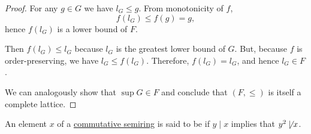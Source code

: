 \begin{proof}
  For any \( g \in G \) we have \( l_G \leq g \). From monotonicity of \( f \),
  \begin{equation*}
    f(l_G) \leq f(g) = g,
  \end{equation*}
  hence \( f(l_G) \) is a lower bound of \( F \).

  Then \( f(l_G) \leq l_G \) because \( l_G \) is the greatest lower bound of \( G \). But, because \( f \) is order-preserving, we have \( l_G \leq f(l_G) \). Therefore, \( f(l_G) = l_G \), and hence \( l_G \in F \).

  We can analogously show that \( \sup G \in F \) and conclude that \( (F, \leq) \) is itself a complete lattice.
\end{proof}

\begin{definition}\label{def:square_free}\mimprovised
  An element \( x \) of a \hyperref[def:semiring/commutative]{commutative semiring} is said to be  if \( y \mid x \) implies that \( y^2 \not\mid x \).
\end{definition}

